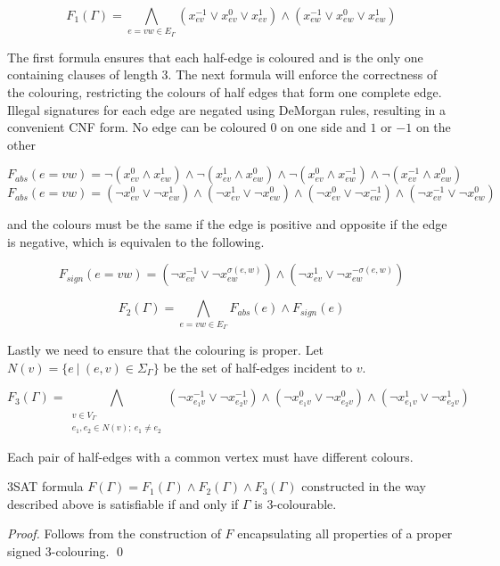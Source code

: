 $$F_1 (\Gamma) = \bigwedge _{e = vw \in E_{\Gamma}} (x^{-1}_{ev} \vee x^{0}_{ev} \vee x^{1}_{ev}) \wedge (x^{-1}_{ew} \vee x^{0}_{ew} \vee x^{1}_{ew}) $$

The first formula ensures that each half-edge is coloured and is the only one containing clauses of length 3. The next formula will enforce the correctness of the colouring, restricting the colours of half edges that form one complete edge. Illegal signatures for each edge are negated using DeMorgan rules, resulting in a convenient CNF form. No edge can be coloured $0$ on one side and $1$ or $-1$ on the other

$$F_{abs} (e = vw) = \neg (x^{0}_{ev} \land x^{1}_{ew}) \land \neg (x^{1}_{ev} \land x^{0}_{ew}) \land \neg (x^{0}_{ev} \land x^{-1}_{ew}) \land \neg (x^{-1}_{ev} \land x^{0}_{ew})$$
$$F_{abs} (e = vw) = (\neg x^{0}_{ev} \lor \neg x^{1}_{ew}) \land (\neg x^{1}_{ev} \lor \neg x^{0}_{ew}) \land (\neg x^{0}_{ev} \lor \neg x^{-1}_{ew}) \land (\neg x^{-1}_{ev} \lor \neg x^{0}_{ew})$$

and the colours must be the same if the edge is positive and opposite if the edge is negative, which is equivalen to the following.

$$F _{sign} (e = vw) = (\neg x^{-1}_{ev} \lor \neg x^{\sigma (e, w)}_{ew}) \land (\neg x^{1}_{ev} \lor \neg x^{-\sigma (e, w)}_{ew})$$

$$F_2 (\Gamma)= \bigwedge _{e = vw \in E_{\Gamma}} F _{abs} (e) \wedge F _{sign} (e)$$

Lastly we need to ensure that the colouring is proper. Let $N(v) = \{e ~|~ (e,v) \in \Sigma _{\Gamma}\}$ be the set of half-edges incident to $v$.

$$F_3 (\Gamma)= \bigwedge _{\substack{v \in V_{\Gamma} \\ e_1, e_2 \in N(v); ~ e_1 \neq e_2}} (\neg x^{-1}_{e_1v} \lor \neg x^{-1}_{e_2v}) \land (\neg x^{0}_{e_1v} \lor \neg x^{0}_{e_2v}) \land (\neg x^{1}_{e_1v} \lor \neg x^{1}_{e_2v}) $$

Each pair of half-edges with a common vertex must have different colours.

\begin{theorem}
    3SAT formula $F(\Gamma) = F_1 (\Gamma) \wedge F_2 (\Gamma) \wedge F_3 (\Gamma)$ constructed in the way described above is satisfiable if and only if $\Gamma$ is 3-colourable.
\end{theorem}

\textit{Proof.} Follows from the construction of $F$ encapsulating all properties of a proper signed 3-colouring. \qed

